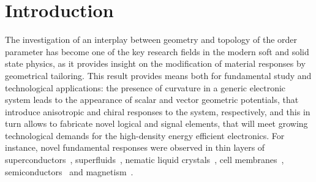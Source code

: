 \section{Introduction}\label{sec:intro}

The investigation of an interplay between geometry and topology of the order parameter has become one of the key research fields in the modern soft and solid state physics, as it provides insight on the modification of material responses by geometrical tailoring. This result provides means both for fundamental study and technological applications: the presence of curvature in a generic electronic system leads to the appearance of scalar and vector geometric potentials, that introduce anisotropic and chiral responses to the system, respectively, and this in turn allows to fabricate novel logical and signal elements, that will meet growing technological demands for the high-density energy efficient electronics. For instance, novel fundamental responses were observed in thin layers of superconductors~\cite{Tempere09,Ying17}, superfluids~\cite{Kuratsuji12}, nematic liquid crystals~\cite{Lopez-Leon11}, cell membranes~\cite{McMahon05}, semiconductors~\cite{Gentile15,Ortix15} and magnetism~\cite{Streubel16}. 
